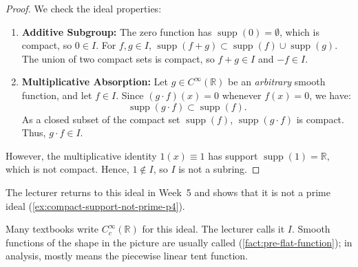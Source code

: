 \begin{content}
\begin{center}
\end{center}


\begin{proof}
We check the ideal properties:
\begin{enumerate}[label=\textbf{(\arabic*)}]
    \item \textbf{Additive Subgroup:} The zero function has $\operatorname{supp}(0) = \emptyset$, which is compact, so $0 \in I$. For $f, g \in I$, $\operatorname{supp}(f + g) \subset \operatorname{supp}(f) \cup \operatorname{supp}(g)$. The union of two compact sets is compact, so $f + g \in I$ and $-f \in I$.
    \item \textbf{Multiplicative Absorption:} Let $g \in C^\infty(\mathbb{R})$ be an \emph{arbitrary} smooth function, and let $f \in I$. Since $(g \cdot f)(x) = 0$ whenever $f(x) = 0$, we have:
    \[
    \operatorname{supp}(g \cdot f) \subset \operatorname{supp}(f).
    \]
    As a closed subset of the compact set $\operatorname{supp}(f)$, $\operatorname{supp}(g \cdot f)$ is compact. Thus, $g \cdot f \in I$.
\end{enumerate}
However, the multiplicative identity $1(x) \equiv 1$ has support $\operatorname{supp}(1) = \mathbb{R}$, which is not compact. Hence, $1 \notin I$, so $I$ is not a subring.
\end{proof}

The lecturer returns to this ideal in Week~5 and shows that it is not a prime ideal (\cref{ex:compact-support-not-prime-p4}).
\end{content}

\begin{aiNote}
Many textbooks write $C_c^\infty(\mathbb{R})$ for this ideal. The lecturer calls it $I$. Smooth functions of the shape in the picture are usually called  (\cref{fact:pre-flat-function}); in analysis,  mostly means the piecewise linear tent function.
\end{aiNote}

